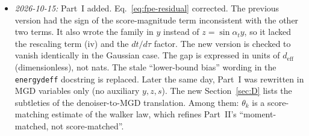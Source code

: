 \documentclass[11pt]{article}
\newcommand{\code}[1]{\texttt{#1}}
\renewcommand{\_}{\origunderscore\allowbreak}
\newcommand{\deff}{d_{\mathrm{eff}}}
\begin{document}
\begin{itemize}
        recommendation to use the denoiser form as the primary estimator
        (Section~\ref{sec:paper-choice}) is a consequence of this.
        Diagnostic script: \code{deff\_diagnostics/deff\_latest\_run\_check.py}
        (per-seed CSVs); CSV-loader notebook:
        \code{turbulence/effective\_dimension\_deff\_final.ipynb}.
  \item \emph{2026-10-15:} Part~I added. Eq.~\ref{eq:fpe-residual} corrected. The
        previous version had the sign of the score-magnitude term inconsistent with the other
        two terms. It also wrote the family in $y$ instead of $z=\sin\alpha_t y$, so it lacked
        the rescaling term (iv) and the $dt/d\tau$ factor. The new version is checked to
        vanish identically in the Gaussian case. The gap is expressed in units of $\deff$
        (dimensionless), not nats. The stale ``lower-bound bias'' wording in the
        \code{energy\_d\_eff} docstring is replaced.
        Later the same day, Part~I was rewritten in MGD variables only
        (no auxiliary $y,z,s$). The new Section~\ref{sec:D} lists the
        subtleties of the denoiser-to-MGD translation. Among them: $\theta_k$ is a
        score-matching estimate of the walker law, which refines Part~II's ``moment-matched, not score-matched''.
\end{itemize}
\end{document}

